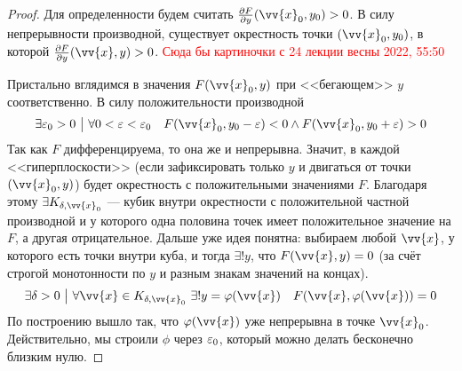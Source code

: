 \begin{proof}
	Для определенности будем считать $\pd{F}{y} (\vv{x}_0, y_0) > 0$. В силу непрерывности производной, существует окрестность точки $(\vv{x}_0, y_0)$, в которой $\pd{F}{y}(\vv{x}, y) > 0$.
	\textcolor{red}{Сюда бы картиночки с 24 лекции весны 2022, 55:50}
	
	Пристально вглядимся в значения $F(\vv{x}_0, y)$ при <<бегающем>> $y$ соответственно. В силу положительности производной
	\[
		\exists \eps_0 > 0 \such \forall 0 < \eps < \eps_0 \quad F(\vv{x}_0, y_0 - \eps) < 0 \wedge F(\vv{x}_0, y_0 + \eps) > 0
	\]
	Так как $F$ дифференцируема, то она же и непрерывна. Значит, в каждой <<гиперплоскости>> (если зафиксировать только $y$ и двигаться от точки $(\vv{x}_0, y)$) будет окрестность с положительными значениями $F$. Благодаря этому $\exists K_{\delta, \vv{x}_0}$ --- кубик внутри окрестности с положительной частной производной и у которого одна половина точек имеет положительное значение на $F$, а другая отрицательное. Дальше уже идея понятна: выбираем любой $\vv{x}$, у которого есть точки внутри куба, и тогда $\exists ! y$, что $F(\vv{x}, y) = 0$ (за счёт строгой монотонности по $y$ и разным знакам значений на концах).
	\[
		\exists \delta > 0 \such \forall \vv{x} \in K_{\delta, \vv{x}_0}\ \exists ! y = \phi(\vv{x}) \quad F(\vv{x}, \phi(\vv{x})) = 0
	\]
	По построению вышло так, что $\phi(\vv{x})$ уже непрерывна в точке $\vv{x}_0$. Действительно, мы строили $\phi$ через $\varepsilon_0$, который можно делать бесконечно близким нулю.
	

\end{proof}
